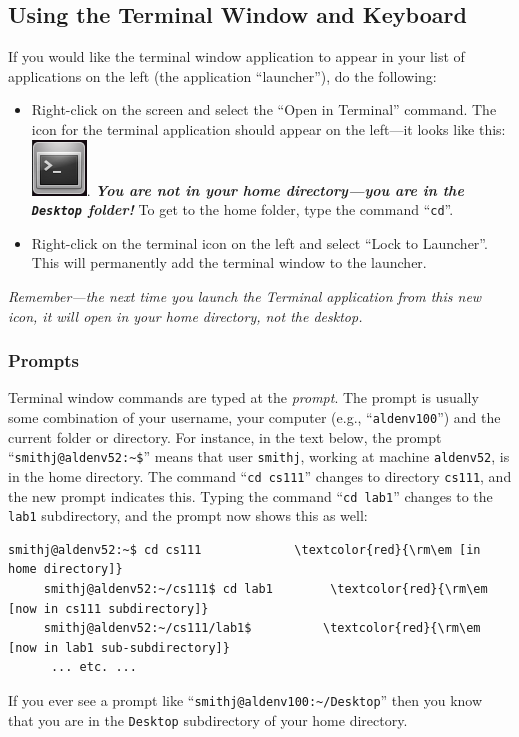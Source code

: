 \vspace{-0.1in}
\subsection*{Using the Terminal Window and Keyboard}
\vspace{-0.1in}
If you would like the terminal window application to appear in your list
of applications on the left (the application ``launcher''), do the following:
\begin{itemize}
\item
Right-click on the screen and select the ``Open in Terminal'' command.
The icon for the terminal application should appear on the left---it
looks like this: \includegraphics[width=.4in]{images/terminal}. 
\textbf{\textit{You are not in your home directory---you are in the 
{\tt Desktop} folder!}} To get to the home folder, type the command ``{\tt cd}''.
\item
Right-click on the terminal icon on the left and select ``Lock to
Launcher''. This will permanently add the terminal window to the launcher.
\end{itemize}

{\em Remember---the next time you launch the Terminal application from
this new icon, it will open in your home directory, not the desktop.}

\vspace{-0.1in}
\subsubsection*{Prompts}
\vspace{-0.1in}
Terminal window commands are typed at 
the {\em prompt}. The prompt is usually some 
combination of your username, your computer (e.g., ``{\tt aldenv100}'')
and the current folder or directory. For instance, in the text below, 
the prompt ``\verb#smithj@aldenv52:~$#'' means that user {\tt smithj},
working at machine {\tt aldenv52}, is in the home directory.
The command ``{\tt cd cs111}'' changes to directory
{\tt cs111}, and the new prompt indicates this. Typing the command 
``{\tt cd lab1}'' changes to the {\tt lab1} subdirectory, and the prompt now
shows this as well:
\begin{Verbatim}[commandchars=\\\{\}]
     smithj@aldenv52:~$ cd cs111             \textcolor{red}{\rm\em [in home directory]}
     smithj@aldenv52:~/cs111$ cd lab1        \textcolor{red}{\rm\em [now in cs111 subdirectory]}
     smithj@aldenv52:~/cs111/lab1$          \textcolor{red}{\rm\em [now in lab1 sub-subdirectory]}
      ... etc. ...
\end{Verbatim}
If you ever see a prompt like ``\verb$smithj@aldenv100:~/Desktop$'' then you
know that you are in the {\tt Desktop} subdirectory of your home directory.

